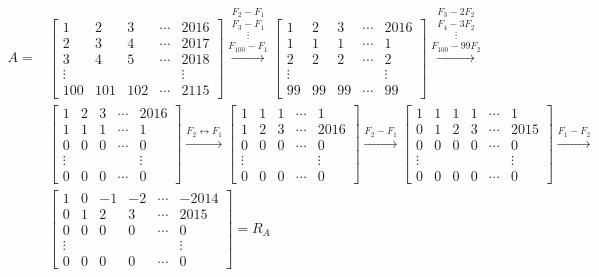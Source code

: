 \documentclass[12pt,reqno]{amsart}
\begin{document}
\begin{enumerate}
\begin{enumerate}
\begin{align*}
A = &\begin{bmatrix}1 & 2 & 3 & \cdots & 2016 \\ 2 & 3 & 4 & \cdots & 2017 \\ 3&4&5& \cdots & 2018\\ \vdots & &&& \vdots \\ 100 & 101 & 102& \cdots& 2115\end{bmatrix} \stackrel{F_2-F_1}{\stackrel{F_3 - F_1}{\stackrel{\vdots}{\stackrel{F_{100}-F_1}{\longrightarrow}}}}
\begin{bmatrix}1 & 2 & 3 & \cdots & 2016 \\ 1 & 1 & 1 & \cdots & 1 \\ 2&2&2& \cdots & 2\\ \vdots & &&& \vdots \\ 99 & 99 & 99& \cdots& 99\end{bmatrix}
\stackrel{F_3-2F_2}{\stackrel{F_4-3F_2}{\stackrel{\vdots}{\stackrel{F_{100}-99F_2}{\longrightarrow}}}} \\
&\begin{bmatrix}1 & 2 & 3 & \cdots & 2016 \\ 1 & 1 & 1 & \cdots & 1 \\ 0&0&0& \cdots & 0\\ \vdots & &&& \vdots \\ 0 & 0 & 0& \cdots& 0\end{bmatrix}
\stackrel{F_2 \leftrightarrow F_1}{\longrightarrow}
\begin{bmatrix}1 & 1 & 1 & \cdots & 1 \\ 1 & 2 & 3 & \cdots & 2016 \\ 0&0&0& \cdots & 0\\ \vdots & &&& \vdots \\ 0 & 0 & 0& \cdots& 0\end{bmatrix}
\stackrel{F_2-F_1}{\longrightarrow}
\begin{bmatrix}1 & 1 & 1 & 1 & \cdots & 1 \\ 0 & 1 & 2 & 3 & \cdots & 2015 \\ 0&0&0&0& \cdots & 0\\ \vdots & &&&& \vdots \\ 0 & 0 & 0&0& \cdots& 0\end{bmatrix}
\stackrel{F_1-F_2}{\longrightarrow} \\
&\begin{bmatrix}1 & 0 & -1 & -2 & \cdots & -2014 \\ 0 & 1 & 2 & 3 & \cdots & 2015 \\ 0&0&0&0& \cdots & 0\\ \vdots & &&&& \vdots \\ 0 & 0 & 0&0& \cdots& 0\end{bmatrix} = R_A
\end{align*}


\end{enumerate}
\end{enumerate}
\end{document}
